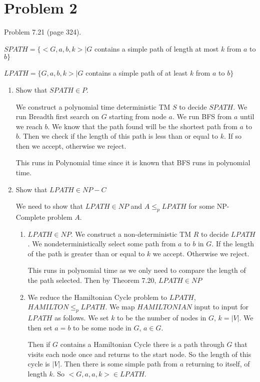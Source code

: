 \documentclass[11pt]{article}
\begin{document}
\newpage
\section*{Problem 2}
Problem 7.21 (page 324).

$SPATH = \{<G, a, b, k> | G$ contains a simple path of length at most $k$ from $a$ to $b\}$

$LPATH = \{G, a, b, k> | G$ contains a simple path of at least $k$ from $a$ to $b \}$


\begin{enumerate}[label=\alph*)]
\item  Show that $SPATH \in P$.

We construct a polynomial time deterministic TM $S$ to decide $SPATH$. We run Breadth first search on $G$ starting from node $a$. We run BFS from $a$ until we reach $b$. We know that the path found will be the shortest path from $a$ to $b$. Then we check if the length of this path is less than or equal to $k$. If so then we accept, otherwise we reject.

This runs in Polynomial time since it is known that BFS runs in polynomial time. 

\item Show that $LPATH \in NP-C$

We need to show that $LPATH \in NP$ and $A \leq _p LPATH$ for some NP-Complete problem $A$.

\begin{enumerate}[label=\arabic*)]

\item $LPATH \in NP$. We construct a non-deterministic TM $R$ to decide $LPATH$. We nondeterministically select some path from $a$ to $b$ in $G$. If the length of the path is greater than or equal to $k$ we accept. Otherwise we reject. 

This runs in polynomial time as we only need to compare the length of the path selected. Then by Theorem 7.20, $LPATH \in NP$


\item  We reduce the Hamiltonian Cycle problem to $LPATH$, $HAMILTON \leq _p LPATH$. We map $HAMILTONIAN$ input to input for $LPATH$ as follows. We set $k$ to be the number of nodes in $G$, $k = |V|$. We then set $a = b$ to be some node in $G$, $a \in G$.

Then if $G$ contains a Hamiltonian Cycle there is a path through $G$ that visits each node once and returns to the start node. So the length of this cycle is $|V|$. Then there is some simple path from $a$ returning to itself, of length $k$. So $<G, a, a, k> \in LPATH$.


\end{enumerate}
\end{enumerate}
\end{document}
